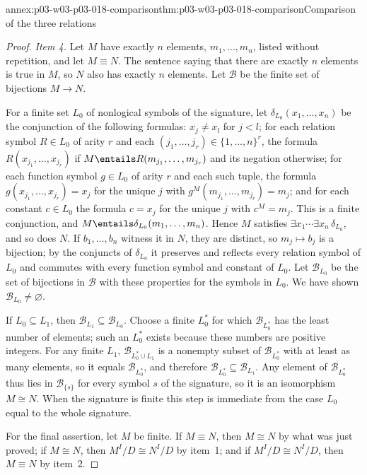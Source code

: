 \begin{annexitem}{annex:p03-w03-p03-018-comparison}{thm:p03-w03-p03-018-comparison}{Comparison of the three relations}
\begin{proof}
\emph{Item 4.}  Let \(M\) have exactly \(n\) elements,
\(m_1,\ldots,m_n\), listed without repetition, and let \(M\equiv N\).  The
sentence saying that there are exactly \(n\) elements is true in \(M\), so
\(N\) also has exactly \(n\) elements.  Let \(\mathcal B\) be the finite set
of bijections \(M\to N\).

For a finite set \(L_0\) of nonlogical symbols of the signature, let
\(\delta_{L_0}(x_1,\ldots,x_n)\) be the conjunction of the following
formulas: \(x_j\ne x_l\) for \(j<l\); for each relation symbol \(R\in L_0\) of
arity \(r\) and each \((j_1,\ldots,j_r)\in\{1,\ldots,n\}^r\), the formula
\(R(x_{j_1},\ldots,x_{j_r})\) if \(M\entails R(m_{j_1},\ldots,m_{j_r})\) and
its negation otherwise; for each function symbol \(g\in L_0\) of arity \(r\)
and each such tuple, the formula \(g(x_{j_1},\ldots,x_{j_r})=x_j\) for the
unique \(j\) with \(g^M(m_{j_1},\ldots,m_{j_r})=m_j\); and for each constant
\(c\in L_0\) the formula \(c=x_j\) for the unique \(j\) with \(c^M=m_j\).
This is a finite conjunction, and \(M\entails\delta_{L_0}(m_1,\ldots,m_n)\).
Hence \(M\) satisfies \(\exists x_1\cdots\exists x_n\,\delta_{L_0}\), and so
does \(N\).  If \(b_1,\ldots,b_n\) witness it in \(N\), they are distinct, so
\(m_j\mapsto b_j\) is a bijection; by the conjuncts of \(\delta_{L_0}\) it
preserves and reflects every relation symbol of \(L_0\) and commutes with
every function symbol and constant of \(L_0\).  Let \(\mathcal B_{L_0}\) be
the set of bijections in \(\mathcal B\) with these properties for the symbols
in \(L_0\).  We have shown \(\mathcal B_{L_0}\ne\varnothing\).

If \(L_0\subseteq L_1\), then \(\mathcal B_{L_1}\subseteq\mathcal B_{L_0}\).
Choose a finite \(L_0^\ast\) for which \(\mathcal B_{L_0^\ast}\) has the least
number of elements; such an \(L_0^\ast\) exists because these numbers are
positive integers.  For any finite \(L_1\),
\(\mathcal B_{L_0^\ast\cup L_1}\) is a nonempty subset of
\(\mathcal B_{L_0^\ast}\) with at least as many elements, so it equals
\(\mathcal B_{L_0^\ast}\), and therefore
\(\mathcal B_{L_0^\ast}\subseteq\mathcal B_{L_1}\).  Any element of
\(\mathcal B_{L_0^\ast}\) thus lies in \(\mathcal B_{\{s\}}\) for every symbol
\(s\) of the signature, so it is an isomorphism \(M\cong N\).  When the
signature is finite this step is immediate from the case \(L_0\) equal to the
whole signature.

For the final assertion, let \(M\) be finite.  If \(M\equiv N\), then
\(M\cong N\) by what was just proved; if \(M\cong N\), then
\(M^I/D\cong N^I/D\) by item~1; and if \(M^I/D\cong N^I/D\), then
\(M\equiv N\) by item~2.
\end{proof}
\end{annexitem}


